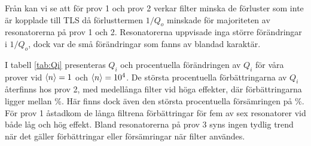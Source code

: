 \documentclass[main.tex]{subfiles}
\begin{document}
Från  kan vi se att för prov 1 och prov 2 verkar filter minska de förluster som inte är kopplade till TLS då förlusttermen $1/Q_o$ minskade för majoriteten av resonatorerna på prov 1 och 2. Resonatorerna uppvisade inga större förändringar i $1/Q_o$, dock var de små förändringar som fanns av blandad karaktär.







I tabell \ref{tab:Qi} presenteras $Q_i$ och procentuella förändringen av $Q_i$ för våra prover vid $\expval{n}=1$ och $\expval{n}=10^4$. De största procentuella förbättringarna av $Q_i$ återfinns hos prov 2, med medellånga filter vid höga effekter, där förbättringarna ligger mellan \unit[11-46]{\%}. Här finns dock även den största procentuella försämringen på \unit[-46]{\%}. För prov 1 åstadkom de långa filtrena förbättringar för fem av sex resonatorer vid både låg och hög effekt. Bland resonatorerna på prov 3 syns ingen tydlig trend när det gäller förbättringar eller försämringar när filter användes.
\end{document}
